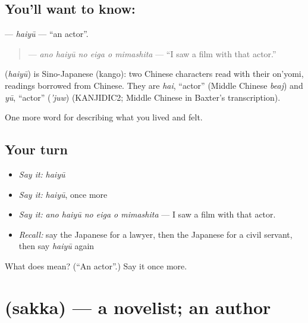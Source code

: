 \subsection*{You'll want to know: }
\textbf{} — \emph{haiyū} — \textquotedblleft{}an actor\textquotedblright{}.

\begin{quote}
\textbf{   } — \emph{ano haiyū no eiga o mimashita} — \textquotedblleft{}I saw a film with that actor.\textquotedblright{}
\end{quote}

\begin{cousinweb}
\textbf{} (\emph{haiyū}) is Sino-Japanese (kango): two Chinese characters read with their on'yomi, readings borrowed from Chinese. They are \emph{hai}, \textquotedblleft{}actor\textquotedblright{} (Middle Chinese \emph{beaj}) and \emph{yū}, \textquotedblleft{}actor\textquotedblright{} (\emph{'juw}) (KANJIDIC2; Middle Chinese in Baxter's transcription).
\end{cousinweb}

\begin{grammarlens}[title={What you've built}]
One more word for describing what you lived and felt.
\end{grammarlens}

\subsection*{Your turn}
\begin{itemize}
\raggedright
  \item \emph{Say it:} \emph{haiyū}
  \item \emph{Say it:} \emph{haiyū}, once more
  \item \emph{Say it:} \emph{ano haiyū no eiga o mimashita} — I saw a film with that actor.
  \item \emph{Recall:} say the Japanese for a lawyer, then the Japanese for a civil servant, then say \emph{haiyū} again
\end{itemize}

\begin{tcolorbox}[breakable,colback=teal!4,colframe=teal!35!black,title={Before you move on}]
What does  mean? (\textquotedblleft{}An actor\textquotedblright{}.) Say it once more.
\end{tcolorbox}
\section[\texorpdfstring{\ja{さっか} (sakka)}{さっか (sakka)}]{ (sakka) — a novelist; an author}

